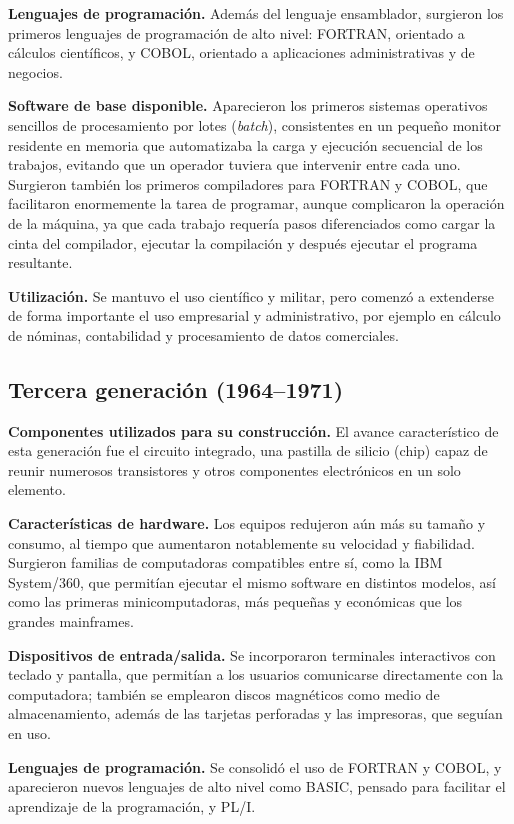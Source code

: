\documentclass[12pt,letterpaper]{article}
\begin{document}
\textbf{Lenguajes de programación.} Además del lenguaje ensamblador, surgieron los primeros lenguajes de programación de alto nivel: FORTRAN, orientado a cálculos científicos, y COBOL, orientado a aplicaciones administrativas y de negocios.

\textbf{Software de base disponible.} Aparecieron los primeros sistemas operativos sencillos de procesamiento por lotes (\textit{batch}), consistentes en un pequeño monitor residente en memoria que automatizaba la carga y ejecución secuencial de los trabajos, evitando que un operador tuviera que intervenir entre cada uno. Surgieron también los primeros compiladores para FORTRAN y COBOL, que facilitaron enormemente la tarea de programar, aunque complicaron la operación de la máquina, ya que cada trabajo requería pasos diferenciados como cargar la cinta del compilador, ejecutar la compilación y después ejecutar el programa resultante.

\textbf{Utilización.} Se mantuvo el uso científico y militar, pero comenzó a extenderse de forma importante el uso empresarial y administrativo, por ejemplo en cálculo de nóminas, contabilidad y procesamiento de datos comerciales.

\subsection{Tercera generación (1964--1971)}

\textbf{Componentes utilizados para su construcción.} El avance característico de esta generación fue el circuito integrado, una pastilla de silicio (chip) capaz de reunir numerosos transistores y otros componentes electrónicos en un solo elemento.

\textbf{Características de hardware.} Los equipos redujeron aún más su tamaño y consumo, al tiempo que aumentaron notablemente su velocidad y fiabilidad. Surgieron familias de computadoras compatibles entre sí, como la IBM System/360, que permitían ejecutar el mismo software en distintos modelos, así como las primeras minicomputadoras, más pequeñas y económicas que los grandes mainframes.

\textbf{Dispositivos de entrada/salida.} Se incorporaron terminales interactivos con teclado y pantalla, que permitían a los usuarios comunicarse directamente con la computadora; también se emplearon discos magnéticos como medio de almacenamiento, además de las tarjetas perforadas y las impresoras, que seguían en uso.

\textbf{Lenguajes de programación.} Se consolidó el uso de FORTRAN y COBOL, y aparecieron nuevos lenguajes de alto nivel como BASIC, pensado para facilitar el aprendizaje de la programación, y PL/I.
\end{document}
